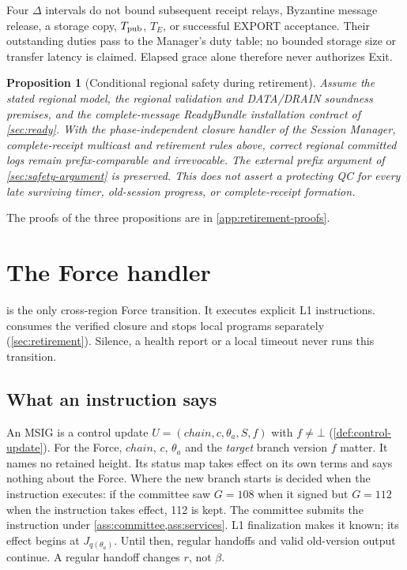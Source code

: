 \documentclass[11pt,a4paper]{article}
\newtheorem{proposition}[proposition]{Proposition}
\begin{document}
Four $\Delta$ intervals do not bound subsequent receipt relays,
Byzantine message release, a storage copy, $T_{\rm pub}$, $T_E$, or
successful EXPORT acceptance. Their outstanding duties pass to the
Manager's duty table; no bounded storage size or transfer latency is
claimed. Elapsed grace alone therefore never authorizes Exit.

\begin{proposition}[Conditional regional safety during retirement]
\label{prop:retirement-safety}
Assume the stated regional model, the regional validation
and DATA/DRAIN soundness premises, and the complete-message ReadyBundle
installation contract of \cref{sec:ready}. With the phase-independent closure handler of the Session Manager,
complete-receipt multicast and retirement rules above, correct regional committed logs
remain prefix-comparable and irrevocable. The external prefix argument
of \cref{sec:safety-argument} is preserved. This does not assert a
protecting QC for every late surviving timer, old-session progress,
or complete-receipt formation.
\end{proposition}


The proofs of the three propositions are in
\cref{app:retirement-proofs}.

\section{The Force handler}
\label{sec:force}
 is the only cross-region Force transition. It executes
explicit L1 instructions.  consumes the verified
closure and stops local programs separately (\cref{sec:retirement}). Silence, a health report
or a local timeout never runs this transition.

\subsection{What an instruction says}
\label{sec:force-stages}
An MSIG is a control update $U=(\mathit{chain},c,\theta_a,S,f)$ with
$f\ne\bot$ (\cref{def:control-update}). For the Force, $\mathit{chain}$,
$c$, $\theta_a$ and the \emph{target} branch version $f$ matter. It names
no retained height. Its status map takes effect on its own
terms and says nothing about the Force. Where the new
branch starts is decided when the instruction executes: if the committee
saw $G=108$ when it signed but $G=112$ when the instruction takes effect,
112 is kept. The committee submits the instruction under
\cref{ass:committee,ass:services}. L1 finalization makes it known; its
effect begins at $J_{q(\theta_a)}$. Until then, regular handoffs and
valid old-version output continue. A regular handoff changes $r$, not
$\beta$.
\end{document}
